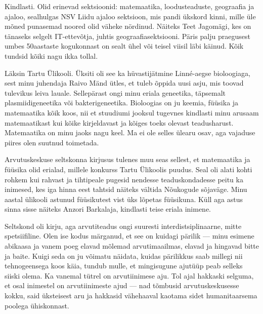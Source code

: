 Kindlasti. Olid erinevad sektsioonid: matemaatika, loodusteaduste, 
geograafia ja ajaloo, sealhulgas NSV Liidu ajaloo sektsioon, mis 
pandi ükskord kinni, mille üle mõned punasemad noored olid väheke nördinud. Näiteks Teet 
Jagomägi, kes on tänaseks selgelt IT-ettevõtja, juhtis 
geograafiasektsiooni. Päris palju praegusest umbes 50aastaste kogukonnast on sealt ühel või teisel viisil läbi käinud. Kõik 
tundsid kõiki nagu ikka tollal.


Läksin Tartu Ülikooli. Üksiti oli see ka hüvastijätmine 
Linné-aegse bioloogiaga, sest minu juhendaja Raivo Mänd ütles, et tuleb õppida uusi asju, mis toovad tulevikus leiva lauale. Sellepärast ongi minu eriala geneetika, täpsemalt plasmiidigeneetika 
või bakterigeneetika. Bioloogias on ju keemia, füüsika ja matemaatika 
kõik koos, nii et stuudiumi jooksul tugevnes kindlasti minu arusaam 
matemaatikast kui kõike kirjeldavast ja kõiges toeks olevast teadusharust. 
Matemaatika on minu jaoks nagu keel. Ma ei ole selles ülearu osav, aga vajaduse 
piires olen suutnud toimetada.


Arvutuskeskuse seltskonna kirjusus tulenes muu seas sellest, et matemaatika 
ja füüsika olid erialad, millele konkurss Tartu Ülikoolis puudus. Seal oli 
alati kohti rohkem kui rahvast ja tihtipeale pugesid nendesse teaduskondadesse 
peitu ka inimesed, kes iga hinna eest tahtsid näiteks vältida Nõukogude 
sõjaväge. Minu aastal ülikooli astunud füüsikutest vist üks lõpetas füüsikuna. 
Küll aga astus sinna sisse näiteks Anzori 
Barkalaja, kindlasti teise eriala inimene. 

Seltskond oli kirju, aga arvutiteadus ongi suuresti 
interdistsiplinaarne, mitte spetsiifiline. Olen 
ise kodus märganud, et see on kuidagi pärilik --- minu esimene abikaasa 
ja vanem poeg elavad mõlemad arvutimaailmas, elavad ja hingavad 
bitte ja baite. Kuigi seda on ju võimatu näidata, kuidas pärilikkus saab 
millegi nii tehnogeensega koos käia, tundub mulle, et mingisugune ajutüüp 
peab selleks siiski olema. Ka vanemal tütrel on arvutiinimese aju. 
Tol ajal hakkaski selguma, et osal inimestel on 
arvutiinimeste ajud --- nad tõmbusid arvutuskeskusesse kokku, said 
üksteisest aru ja hakkasid vähehaaval kaotama sidet humanitaarsema poolega 
ühiskonnast.

